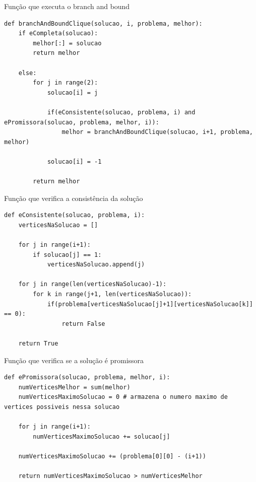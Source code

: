 \documentclass[compress,aspectratio=169]{beamer}
\begin{document}
    \begin{frame}[fragile]{Função que executa o branch and bound}
        \begin{lstlisting}
def branchAndBoundClique(solucao, i, problema, melhor):
    if eCompleta(solucao):
        melhor[:] = solucao
        return melhor
    
    else:
        for j in range(2):
            solucao[i] = j
            
            if(eConsistente(solucao, problema, i) and ePromissora(solucao, problema, melhor, i)):
                melhor = branchAndBoundClique(solucao, i+1, problema, melhor)
            
            solucao[i] = -1
        
        return melhor
        \end{lstlisting}
    \end{frame}

    \begin{frame}[fragile]{Função que verifica a consistência da solução}
        \begin{lstlisting}
def eConsistente(solucao, problema, i):
    verticesNaSolucao = []
    
    for j in range(i+1):
        if solucao[j] == 1:
            verticesNaSolucao.append(j)

    for j in range(len(verticesNaSolucao)-1):
        for k in range(j+1, len(verticesNaSolucao)):
            if(problema[verticesNaSolucao[j]+1][verticesNaSolucao[k]] == 0):
                return False
            
    return True 
        \end{lstlisting}
    \end{frame}

    \begin{frame}[fragile]{Função que verifica se a solução é promissora}
        \begin{lstlisting}
def ePromissora(solucao, problema, melhor, i):
    numVerticesMelhor = sum(melhor)
    numVerticesMaximoSolucao = 0 # armazena o numero maximo de vertices possiveis nessa solucao
    
    for j in range(i+1):
        numVerticesMaximoSolucao += solucao[j]

    numVerticesMaximoSolucao += (problema[0][0] - (i+1))
    
    return numVerticesMaximoSolucao > numVerticesMelhor
        \end{lstlisting}
    \end{frame}
\end{document}
